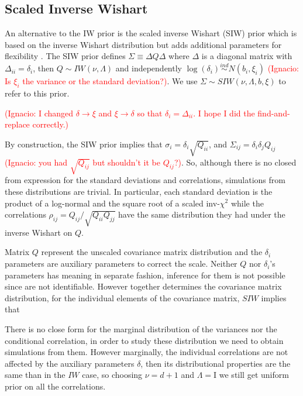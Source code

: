 \documentclass[a4paper]{article}
\newcommand{\nacho}[1]{\textcolor{red}{(Ignacio: #1)}}
\newcommand{\I}{\mathrm{I}}
\begin{document}
\subsection{Scaled Inverse Wishart \label{sec:siw}}

An alternative to the IW prior is the scaled inverse Wishart (SIW) prior which is based on the inverse Wishart distribution but adds additional parameters for flexibility \citep{odomain}. The SIW prior defines $\Sigma \equiv \Delta Q \Delta $ where $\Delta$ is a diagonal matrix with $\Delta_{ii}=\delta_i$, then $Q \sim  IW(\nu, \Lambda)$ and independently $\log(\delta_i) \stackrel{ind} \sim N(b_i, \xi_i)$ \nacho{Is $\xi_i$ the variance or the standard deviation?}.  We use $\Sigma \sim SIW(\nu, \Lambda, b, \xi)$ to refer to this prior. 

\nacho{I changed $\delta\to\xi$ and $\xi\to\delta$ so that $\delta_i=\Delta_{ii}$. I hope I did the find-and-replace correctly.}

By construction, the SIW prior implies that $\sigma_i = \delta_i \sqrt{Q_{ii}}$, and $\Sigma_{ij}=\delta_i\delta_jQ_{ij}$ \nacho{you had $\sqrt{Q_{ij}}$ but shouldn't it be $Q_{ij}$?}. So, although there is no closed from expression for the standard deviations and correlations, simulations from these distributions are trivial. In particular, each standard deviation is the product of a log-normal and the square root of a scaled inv-$\chi^2$ while the correlations $\rho_{ij} = Q_{ij}/\sqrt{Q_{ii}Q_{jj}}$ have the same distribution they had under the inverse Wishart on $Q$.  

Matrix $Q$ represent the unscaled covariance matrix distribution and the $\delta_i$ parameters are auxiliary parameters to correct the scale. Neither $Q$ nor $\delta_i$'s  parameters has meaning in separate fashion, inference for them is not possible since are not identifiable.  However together determines the covariance matrix distribution, for the individual elements of the covariance matrix, $SIW$ implies that 

  

There is no close form for the marginal distribution of the variances nor the conditional correlation, in order to study these distribution we need to obtain simulations from them. However marginally, the individual correlations are not affected by the auxiliary parameters $\delta$, then its distributional properties are the same than in the $IW$ case, so choosing $\nu=d+1$ and $ \Lambda=\I$ we still get uniform prior on all the correlations. 
\end{document}
